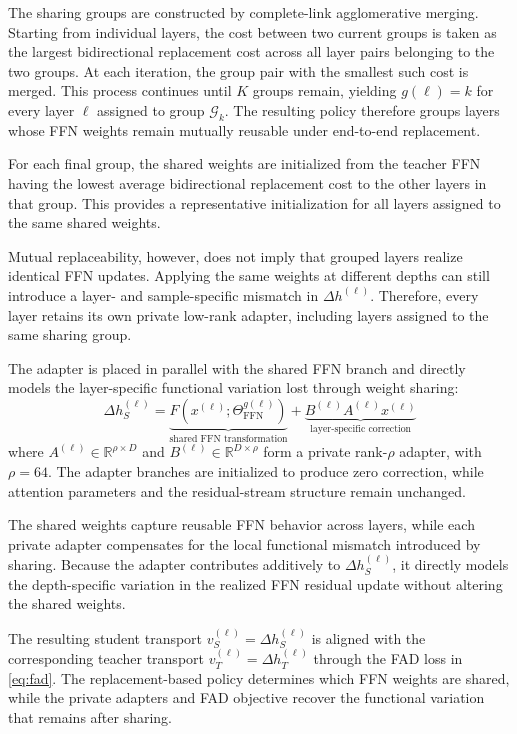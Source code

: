 \documentclass[letterpaper]{article} %
\newcommand{\R}{\mathbb{R}}
\newcommand{\FFN}{\mathrm{FFN}}
\theoremstyle{plain}
\theoremstyle{definition}
\begin{document}
The sharing groups are constructed by complete-link agglomerative merging.
Starting from individual layers, the cost between two current groups is taken
as the largest bidirectional replacement cost across all layer pairs belonging
to the two groups. At each iteration, the group pair with the smallest such
cost is merged. This process continues until $K$ groups remain, yielding
$g(\ell)=k$ for every layer $\ell$ assigned to group $\mathcal G_k$.
The resulting policy therefore groups layers whose FFN weights remain
mutually reusable under end-to-end replacement.

For each final group, the shared weights are initialized from the teacher FFN
having the lowest average bidirectional replacement cost to the other layers
in that group. This provides a representative initialization for all layers
assigned to the same shared weights.

Mutual replaceability, however, does not imply that grouped layers realize
identical FFN updates. Applying the same weights at different depths can still
introduce a layer- and sample-specific mismatch in
$\Delta h^{(\ell)}$. Therefore, every layer retains its own private low-rank
adapter, including layers assigned to the same sharing group.

The adapter is placed in parallel with the shared FFN branch and directly
models the layer-specific functional variation lost through weight sharing:
\begin{equation}
  \Delta h_S^{(\ell)}
  =
  \underbrace{
    F\!\left(
      x^{(\ell)};
      \Theta_{\FFN}^{g(\ell)}
    \right)
  }_{\text{shared FFN transformation}}
  +
  \underbrace{
    B^{(\ell)}A^{(\ell)}x^{(\ell)}
  }_{\text{layer-specific correction}}
  \label{eq:student-ffn}
\end{equation}
where
$A^{(\ell)}\!\in\!\R^{\rho\times D}$ and
$B^{(\ell)}\!\in\!\R^{D\times\rho}$ form a private rank-$\rho$ adapter,
with $\rho=64$. The adapter branches are initialized to produce zero
correction, while attention parameters and the residual-stream structure
remain unchanged.

The shared weights capture reusable FFN behavior across layers, while each
private adapter compensates for the local functional mismatch introduced by
sharing. Because the adapter contributes additively to
$\Delta h_S^{(\ell)}$, it directly models the depth-specific variation in the
realized FFN residual update without altering the shared weights.

The resulting student transport
$v_S^{(\ell)}=\Delta h_S^{(\ell)}$ is aligned with the corresponding teacher
transport $v_T^{(\ell)}=\Delta h_T^{(\ell)}$ through the FAD loss in
\eqref{eq:fad}. The replacement-based policy determines which FFN weights are
shared, while the private adapters and FAD objective recover the functional
variation that remains after sharing.
\end{document}

